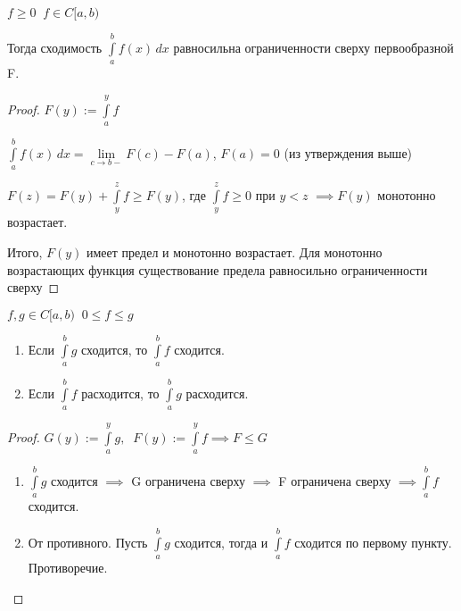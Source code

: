 
\begin{theorem} \thmslashn
    $f \ge 0 \;\; f \in C[a,b)$

    Тогда сходимость $\int\limits_a^b f(x) \, dx$ равносильна ограниченности сверху первообразной F.
\end{theorem}

\begin{proof} \thmslashn

    $F(y) := \int\limits_{a}^{y} f$

    $\int\limits_a^b f(x) \, dx =\lim\limits_{c \to b-} F(c) - F(a)$, $F(a) = 0$ (из утверждения выше)

    $F(z) = F(y) + \int\limits_{y}^{z} f \ge F(y)$, где $\int\limits_{y}^{z} f \ge 0$ при $y < z$ $\implies F(y)$ монотонно возрастает.

    Итого, $F(y)$ имеет предел и монотонно возрастает. Для монотонно возрастающих функция существование предела равносильно ограниченности сверху

\end{proof}

\begin{consequence} \thmslashn
    $f,g \in C[a,b)  \;\; 0 \le f \le g $
    \begin{enumerate}
    
        \item Если $\int\limits_{a}^{b} g$ сходится, то $\int\limits_{a}^{b} f$ сходится.
        
        \item Если $\int\limits_{a}^{b} f$ расходится, то $\int\limits_{a}^{b} g$ расходится.
        
    \end{enumerate}
\end{consequence}

\begin{proof} \thmslashn

    $G(y) := \int\limits_{a}^{y} g, \;\; F(y) := \int\limits_{a}^{y} f \implies F \le G$  
    \begin{enumerate}
    
        \item $\int\limits_{a}^{b} g$ сходится $\implies$ G ограничена сверху $\implies$ F ограничена сверху $\implies \int\limits_{a}^{b} f$ сходится.
        
        \item От противного. Пусть $\int\limits_{a}^{b} g$ сходится, тогда и $\int\limits_{a}^{b} f$ сходится по первому пункту. Противоречие.
        
    \end{enumerate}
\end{proof}

